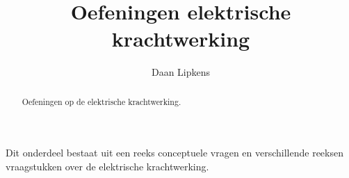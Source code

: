 \documentclass{ximera}
\title{Oefeningen elektrische krachtwerking}
\author{Daan Lipkens}
\begin{document}
\begin{abstract}
    Oefeningen op de elektrische krachtwerking.
\end{abstract}
\maketitle

Dit onderdeel bestaat uit een reeks conceptuele vragen en verschillende reeksen vraagstukken over de elektrische krachtwerking.
\end{document}
